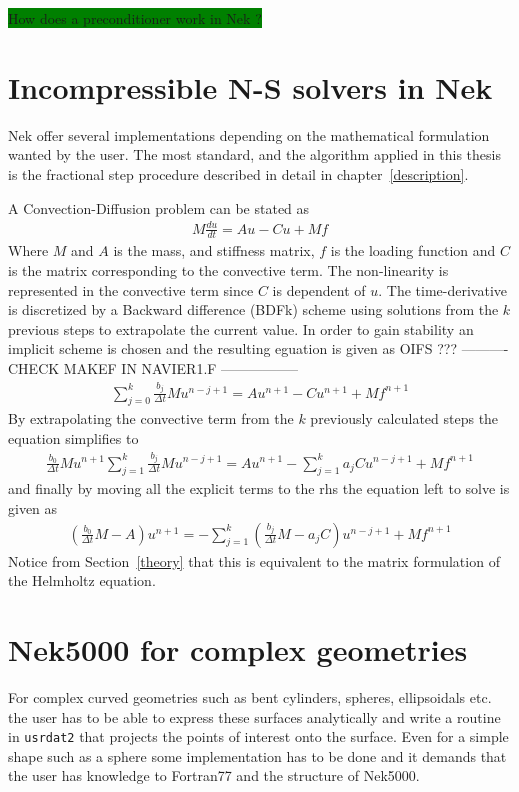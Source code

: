 \colorbox{green}{How does a preconditioner work in Nek ?}

%
\section{Incompressible N-S solvers in Nek}
Nek offer several implementations depending on the mathematical formulation wanted by the user.
The most standard, and the algorithm applied in this thesis is the fractional step procedure 
described in detail in chapter~\ref{description}.


A Convection-Diffusion problem can be stated as 
\begin{align}
    M\frac{du}{dt} = Au-Cu+Mf
    \label{eq:conv-diff}
\end{align}
% 
Where $M$ and $A$ is the mass, and stiffness matrix, $f$ is the loading function and $C$ is 
the matrix corresponding to the convective term. The non-linearity is represented in the 
convective term since $C$ is dependent of $u$.
The time-derivative is discretized by a Backward difference (BDFk) scheme using solutions 
from the $k$ previous steps to extrapolate the current value. In order to gain stability 
an implicit scheme is chosen and the resulting eguation is given as 
%
OIFS ???
---------- CHECK MAKEF IN NAVIER1.F ----------------- 
\begin{align}
    \sum_{j=0}^{k}\frac{b_j}{\Delta t}Mu^{n-j+1} = Au^{n+1}-Cu^{n+1}+Mf^{n+1}
    \label{eq:conv-diff2}
\end{align}
% 
By extrapolating the convective term from the $k$ previously calculated steps the equation 
simplifies to 
%
\begin{align}
   \frac{b_0}{\Delta t}Mu^{n+1} \sum_{j=1}^{k}\frac{b_j}{\Delta t}Mu^{n-j+1} 
   = Au^{n+1}-\sum_{j=1}^{k}a_jCu^{n-j+1}+Mf^{n+1}
    \label{eq:conv-diff3}
\end{align}
% 
and finally by moving all the explicit terms to the rhs the equation left to solve is given as 
%
\begin{align}
   (\frac{b_0}{\Delta t}M-A)u^{n+1} 
   = -\sum_{j=1}^{k}(\frac{b_j}{\Delta t}M-a_jC)u^{n-j+1}+Mf^{n+1}
    \label{eq:conv-diff4}
\end{align}
% 
Notice from Section~\ref{theory} that this is equivalent to the matrix formulation of 
the Helmholtz equation.



\section{Nek5000 for complex geometries}
For complex curved geometries such as bent cylinders, spheres, ellipsoidals etc.
the user has to be able to express these surfaces analytically and write a routine
in \verb|usrdat2| that projects the points of interest onto the surface.
Even for a simple shape such as a sphere some implementation has to be done and it 
demands that the user has knowledge to Fortran77 and the structure of Nek5000.

